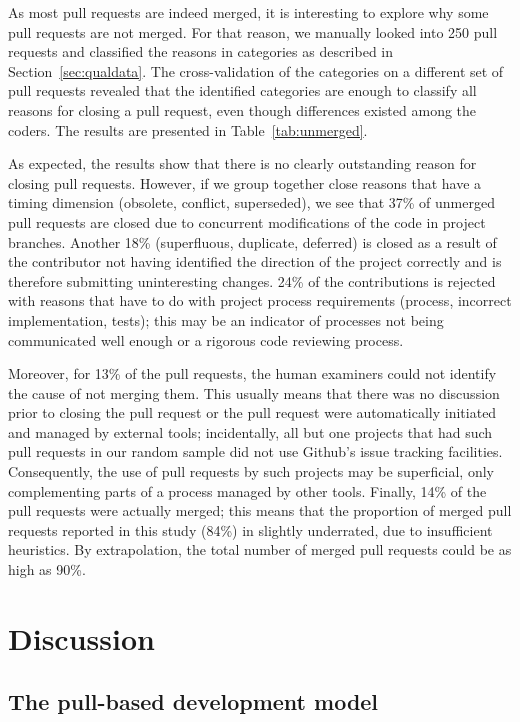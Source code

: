 \documentclass{sig-alternate}
\begin{document}
As most pull requests are indeed merged, it is interesting to explore why some
pull requests are not merged. For that reason, we manually looked into 
250 pull requests and classified the reasons in categories as described in
Section~\ref{sec:qualdata}. The cross-validation of the categories on a different set of
pull requests 
revealed that the identified categories are enough to classify all reasons for closing a pull request, even though differences existed among the coders.
The results are presented in Table~\ref{tab:unmerged}. 

As expected, the results show that there is no clearly outstanding reason for closing pull requests. However, if we group together close reasons that have a timing dimension (\textsf{obsolete}, \textsf{conflict}, \textsf{superseded}), we
see that 37\% of unmerged pull requests are closed due to concurrent
modifications of the code in project branches.
Another 18\% (\textsf{superfluous}, \textsf{duplicate}, \textsf{deferred}) is closed as a result of the contributor not having identified the direction of the project correctly and is therefore submitting uninteresting changes. 24\% of the
contributions is rejected with reasons that have to do with project process requirements (\textsf{process}, \textsf{incorrect implementation}, \textsf{tests}); this may be an indicator of processes not being communicated well enough or a rigorous code reviewing process.

Moreover, for 13\% of the pull requests, the human examiners could not identify
the cause of not merging them.  This usually means that there was no discussion
prior to closing the pull request or the pull request were automatically
initiated and managed by external tools; incidentally, all but one projects that
had such pull requests in our random sample did not use Github's issue tracking
facilities. Consequently, the use of pull requests by such projects may be
superficial, only complementing parts of a process managed by other tools.
Finally, 14\% of the pull requests were actually merged; this means that the
proportion of merged pull requests reported in this study (84\%) in slightly
underrated, due to insufficient heuristics. By extrapolation, the total number
of merged pull requests could be as high as 90\%.

\section{Discussion}
\label{sec:discussion}

\subsection{The pull-based development model}
\end{document}
